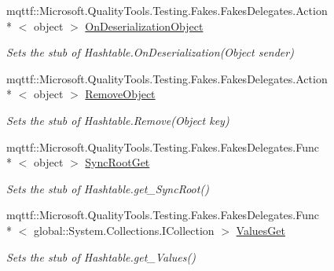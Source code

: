 \begin{DoxyCompactItemize}
mqttf\-::\-Microsoft.\-Quality\-Tools.\-Testing.\-Fakes.\-Fakes\-Delegates.\-Action\\*
$<$ object $>$ \hyperlink{class_system_1_1_configuration_1_1_fakes_1_1_stub_settings_attribute_dictionary_abb08597650c205c6c5e972404d81cd6e}{On\-Deserialization\-Object}
\begin{DoxyCompactList}\small\item\em Sets the stub of Hashtable.\-On\-Deserialization(\-Object sender)\end{DoxyCompactList}\item 
mqttf\-::\-Microsoft.\-Quality\-Tools.\-Testing.\-Fakes.\-Fakes\-Delegates.\-Action\\*
$<$ object $>$ \hyperlink{class_system_1_1_configuration_1_1_fakes_1_1_stub_settings_attribute_dictionary_ade81eb54b14e244b2379079139f73c63}{Remove\-Object}
\begin{DoxyCompactList}\small\item\em Sets the stub of Hashtable.\-Remove(\-Object key)\end{DoxyCompactList}\item 
mqttf\-::\-Microsoft.\-Quality\-Tools.\-Testing.\-Fakes.\-Fakes\-Delegates.\-Func\\*
$<$ object $>$ \hyperlink{class_system_1_1_configuration_1_1_fakes_1_1_stub_settings_attribute_dictionary_ae451c57929ecd6cf14a4271d44c12915}{Sync\-Root\-Get}
\begin{DoxyCompactList}\small\item\em Sets the stub of Hashtable.\-get\-\_\-\-Sync\-Root()\end{DoxyCompactList}\item 
mqttf\-::\-Microsoft.\-Quality\-Tools.\-Testing.\-Fakes.\-Fakes\-Delegates.\-Func\\*
$<$ global\-::\-System.\-Collections.\-I\-Collection $>$ \hyperlink{class_system_1_1_configuration_1_1_fakes_1_1_stub_settings_attribute_dictionary_aaaba3fdbfa2116c187f114287ab49e37}{Values\-Get}
\begin{DoxyCompactList}\small\item\em Sets the stub of Hashtable.\-get\-\_\-\-Values()\end{DoxyCompactList}\end{DoxyCompactItemize}
